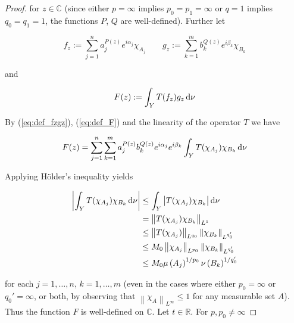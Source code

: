 \begin{proof}
\noindent for $z \in \mathbb{C}$ (since either $p = \infty$ implies $p_0 = p_1 = \infty$ or $q = 1$ implies $q_0 = q_1 = 1$, the functions $P$, $Q$ are well-defined). Further let
				
\begin{equation}
	f_z := \sum_{j = 1}^n a^{P(z)}_j e^{i\alpha_j}\chi_{A_j} \qquad g_z :=  \sum_{k = 1}^m b^{Q(z)}_k e^{i\beta_k}\chi_{B_k}
	\label{eq:def_fzgz}
\end{equation}
				
\noindent and 

\begin{equation}
	F(z) := \int_Y T(f_z)g_z\mathop{}\!\mathrm{d}\nu
	\label{eq:def_F}
\end{equation}

By (\ref{eq:def_fzgz}), (\ref{eq:def_F}) and the linearity of the operator $T$ we have

\begin{gather*}
	F(z) = \sum_{j = 1}^n\sum_{k = 1}^m a^{P(z)}_j b_k^{Q(z)} e^{i\alpha_j} e^{i\beta_k} \int_YT(\chi_{A_j})\chi_{B_k}\mathop{}\!\mathrm{d}\nu
\end{gather*}

Applying H\"older's inequality yields

\begin{gather}
	\begin{aligned}
		\left| \int_YT(\chi_{A_j})\chi_{B_k}\mathop{}\!\mathrm{d}\nu \right| &\leq \int_Y\left| T(\chi_{A_j})\chi_{B_k}\right|\mathop{}\!\mathrm{d}\nu\\
		&= \left\|T(\chi_{A_j})\chi_{B_k}\right\|_{L^1}\\
		&\leq \left\|T(\chi_{A_j})\right\|_{L^{q_0}} \left\|\chi_{B_k}\right\|_{L^{q_0'}}\\
		&\leq M_0\left\|\chi_{A_j}\right\|_{L^{p_0}} \left\|\chi_{B_k}\right\|_{L^{q_0'}}\\
		&\leq M_0 \mu\left(A_j\right)^{1/p_0}\nu\left(B_k\right)^{1/q_0'}
	\end{aligned}
	\label{est:constant_F}
\end{gather}

\noindent for each $j = 1,\hdots,n$, $k = 1,\hdots,m$ (even in the cases where either $p_0 = \infty$ or $q_0' = \infty$, or both, by observing that $\left\| \chi_{A}\right\|_{L^\infty} \leq 1$ for any measurable set $A$). Thus the function $F$ is well-defined on $\mathbb{C}$. Let $t \in \mathbb{R}$. For $p,p_0 \neq \infty$


\end{proof}
